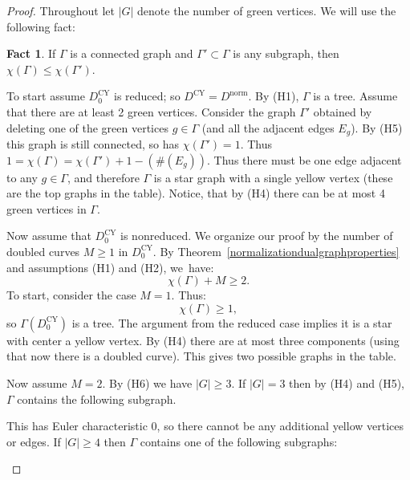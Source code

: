 \documentclass[JEP,XML,SOM,Unicode,NoFloatCountersInSection,published]{cedram}
\theoremstyle{plain}
\theoremstyle{definition}
\newtheorem*{Fact}{Fact}
\newcommand\Dcy{{D^{\mathrm{CY}}}}
\newcommand\Dcyo{{D^{\mathrm{CY}}_0}}
\newcommand\Dnorm{{D^{\mathrm{norm}}}}
\begin{document}
\begin{proof}
Throughout let $|G|$ denote the number of green vertices. We will use the following fact:

\begin{Fact}
 If $\Gamma$ is a connected graph and $\Gamma'\subset \Gamma$ is any subgraph, then $\chi(\Gamma)\le \chi(\Gamma')$.
\end{Fact}

To start assume $\Dcyo$ is reduced; so $\Dcy = \Dnorm$. By (H1), $\Gamma$ is a tree. Assume that there are at least 2 green vertices. Consider the graph $\Gamma'$ obtained by deleting one of the green vertices $g\in \Gamma$ (and all the adjacent edges $E_g$). By (H5) this graph is still connected, so has $\chi(\Gamma') = 1$. Thus $1=\chi(\Gamma) = \chi(\Gamma')+1-(\#(E_g))$. Thus there must be one edge adjacent to any $g \in \Gamma$, and therefore $\Gamma$ is a star graph with a single yellow vertex (these are the top graphs in the table). Notice, that by (H4) there can be at most 4 green vertices in $\Gamma$.

Now assume that $\Dcyo$ is nonreduced. We organize our proof by the number of doubled curves $M\ge 1$ in $\Dcyo$. By Theorem~\ref{normalizationdualgraphproperties} and assumptions (H1) and (H2), we~have:\vspace*{-3pt}%
\begin{equation}
\chi(\Gamma)+M\ge 2.
\end{equation}
To start, consider the case $M=1$. Thus:\vspace*{-3pt}
\[
\chi(\Gamma)\ge 1,
\]
so $\Gamma(\Dcyo)$ is a tree. The argument from the reduced case implies it is a star with center a yellow vertex. By (H4) there are at most three components (using that now there is a doubled curve). This gives two possible graphs in the table.

Now assume $M=2$. By (H6) we have $|G| \ge 3$. If $|G|=3$ then by (H4) and (H5), $\Gamma$ contains the following subgraph.

\begin{figure}[htb]
\vspace*{-5pt}
\centering
\scalebox{1.3}{}
\vspace*{-5pt}
\end{figure}

\noindent This has Euler characteristic 0, so there cannot be any additional yellow vertices or edges. If $|G|\ge 4$ then $\Gamma$ contains one of the following subgraphs:
\begin{figure}[htb]
\vspace*{-5pt}
\centering
\scalebox{1.3}{}
\vspace*{-3pt}
\end{figure}


\end{proof}
\end{document}
